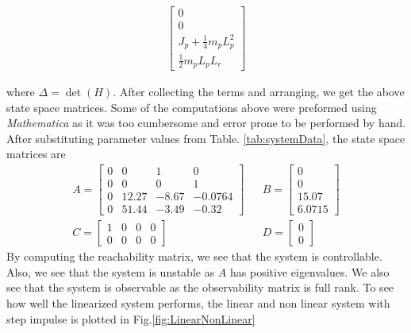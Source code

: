 \documentclass[superscriptaddress,floatfix,reprint,amssymb, amsmath,aps, pre]{revtex4-1}
\begin{document}
{{\begin{widetext}
\begin{gather}
                \begin{bmatrix}
                    0\\
                    0\\
                    J_{p}+\frac{1}{4} m_{p} L_{p}^{2}\\
                    \frac{1}{2} m_{p} L_{p} L_{r}
                \end{bmatrix}
            \end{gather}
        \end{widetext}
        where \(\Delta = \det(H)\). After collecting the terms and arranging, we get the above state space matrices. Some of the computations above were preformed using \textit{Mathematica} as it was too cumbersome and error prone to be performed by hand. After substituting parameter values from Table. \ref{tab:systemData}, the state space matrices are 
        \begin{align*}
            A = \begin{bmatrix}
                0 & 0 & 1 & 0\\
                0 & 0 & 0 & 1 \\
                0 & 12.27 & -8.67 &-0.0764\\
                0 & 51.44 &-3.49 &-0.32
            \end{bmatrix} &&
            B = \begin{bmatrix}
                0\\
                0\\
                15.07\\
                6.0715
            \end{bmatrix} \\
            C = \begin{bmatrix}
                1 & 0 & 0 & 0\\
                0 & 0 & 0 & 0
            \end{bmatrix} &&
            D = \begin{bmatrix}
                0 \\ 
                0
            \end{bmatrix}
        \end{align*}
        By computing the reachability matrix, we see that the system is controllable. Also, we see that the system is unstable as \(A\) has positive eigenvalues. We also see that the system is observable as the observability matrix is full rank. To see how well the linearized system performs, the linear and non linear system with step impulse is plotted in Fig.\ref{fig:LinearNonLinear}
}}
\end{document}
